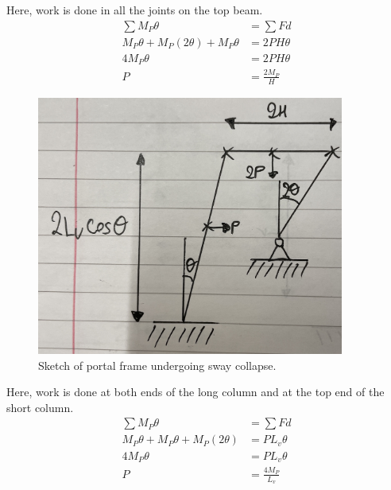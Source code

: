 \documentclass[11pt]{article}
\numberwithin{equation}{section}
\begin{document}
Here, work is done in all the joints on the top beam. 
\begin{align}
    \sum M_P \theta &= \sum Fd\\
    M_P \theta + M_P (2\theta) + M_P \theta &= 2P H \theta\\
    4M_P \theta &= 2PH\theta\\
    P &= \frac{2M_P}{H} 
\end{align}
\begin{figure}[H]
    \centering
    \includegraphics[width =0.9\textwidth]{./img/q3i3.jpg}
    \caption{Sketch of portal frame undergoing sway collapse.}
\end{figure}
Here, work is done at both ends of the long column and at the top end of the short column.
\begin{align}
    \sum M_P \theta &= \sum Fd\\
    M_P\theta + M_P \theta + M_P (2\theta) &= PL_v \theta\\
    4M_P \theta &= PL_v \theta\\
    P &= \frac{4M_P}{L_v}
\end{align}
\end{document}
